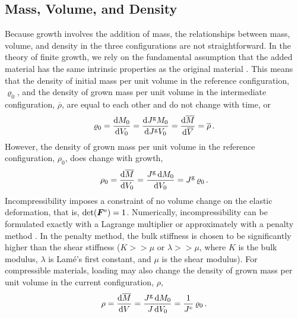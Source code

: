 \documentclass[10pt,letterpaper,oneside]{report}
\newcommand{\sca}[1]{\mbox{\rm{#1}}{}} %
\newcommand{\ten}[1]{\mbox{\boldmath $#1$}{}}
\newcommand{\scas}[1]{\mbox{{\scriptsize{${\rm{#1}}$}}}{}}
\begin{document}
\begin{itemize}
\subsection{Mass, Volume, and Density}
Because growth involves the addition of mass, the relationships between mass, volume, and density in the three configurations are not straightforward.  In the theory of finite growth, we rely on the fundamental assumption that the added material has the same intrinsic properties as the original material \cite{Rodriguez1994}.  This means that 
the density of initial mass per unit volume in the reference configuration, $\varrho_0$, and
the density of grown mass per unit volume in the intermediate configuration, $\overline{\rho}$,
are equal to each other and do not change with time, or  
\begin{equation}
\varrho_0 = \frac{\sca{d} M_0}{\sca{d} V_0} = \frac{\sca{d} J^{\scas{g}} M_0}{\sca{d} J^{\scas{g}} V_0} = \frac{\sca{d} \overline{M}}{\sca{d} \overline{V}} = \overline{\rho} \, .
\end{equation}
However, the density of grown mass per unit volume in the reference configuration, $\rho_0$, does change with growth,
\begin{equation}
\rho_0 = \frac{ \sca{d} \overline{M} }{ \sca{d} V_0 } = \frac{ J^{\scas{g}} \, \sca{d} M_0 }{ \sca{d} V_0 } = J^{\scas{g}} \, \varrho_0 \, .
\end{equation}
Incompressibility imposes a constraint of no volume change on the elastic deformation, that is, $\det (\ten{F}^{\scas{e}}) = 1$.  Numerically, incompressibility can be formulated exactly with a Lagrange multiplier or approximately with a penalty method \cite{Hughes}.  In the penalty method, the bulk stiffness is chosen to be significantly higher than the shear stiffness ($K >> \mu$ or $\lambda >> \mu$, where $K$ is the bulk modulus, $\lambda$ is Lam\'{e}'s first constant, and $\mu$ is the shear modulus).  
For compressible materials, loading may also change the density of grown mass per unit volume in the current configuration, $\rho$,
\begin{equation}
\rho = \frac{ \sca{d} \overline{M} }{ \sca{d} V } = \frac{ J^{\scas{g}} \, \sca{d} M_0 }{ J \, \sca{d} V_0 } = \frac{1}{J^{\scas{e}}} \, \varrho_0 \, .
\end{equation}


\end{itemize}
\end{document}
